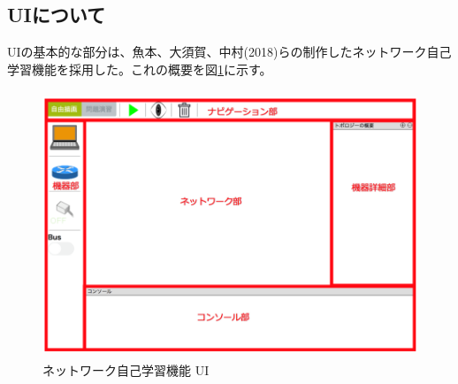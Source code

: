 \subsection{UIについて}
\label{tag:ui}
UIの基本的な部分は、魚本、大須賀、中村(2018)らの制作したネットワーク自己学習機能を採用した。これの概要を図\ref{fig:simu}に示す。

\begin{figure}[htbp]
  \begin{center}
    \includegraphics[clip,width=12.0cm,height=8.0cm]{img/simu2.png}
    \caption{ネットワーク自己学習機能 UI}
    \label{fig:simu}
  \end{center}
\end{figure}

